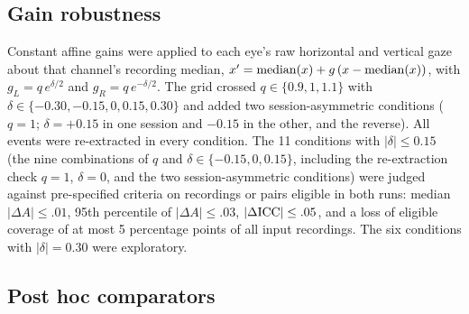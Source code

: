 \subsection{Gain robustness}

Constant affine gains were applied to each eye's raw horizontal and vertical gaze about that channel's recording median, $x' = \operatorname{median}(x) + g\,(x - \operatorname{median}(x))$, with $g_L = q\,e^{\delta/2}$ and $g_R = q\,e^{-\delta/2}$. The grid crossed $q \in \{0.9, 1, 1.1\}$ with $\delta \in \{-0.30, -0.15, 0, 0.15, 0.30\}$ and added two session-asymmetric conditions ($q = 1$; $\delta = +0.15$ in one session and $-0.15$ in the other, and the reverse). All events were re-extracted in every condition. The 11 conditions with $|\delta| \le 0.15$ (the nine combinations of $q$ and $\delta \in \{-0.15, 0, 0.15\}$, including the re-extraction check $q = 1$, $\delta = 0$, and the two session-asymmetric conditions) were judged against pre-specified criteria on recordings or pairs eligible in both runs: median $|\Delta A| \le .01$, 95th percentile of $|\Delta A| \le .03$, $|\Delta\mathrm{ICC}| \le .05$, and a loss of eligible coverage of at most 5 percentage points of all input recordings. The six conditions with $|\delta| = 0.30$ were exploratory.

\subsection{Post hoc comparators}

